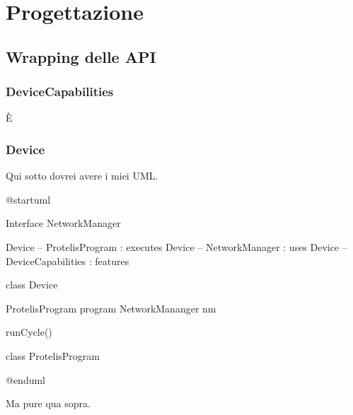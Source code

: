 \section{Progettazione}

\subsection{Wrapping delle API}

\subsubsection{DeviceCapabilities}

È

\subsubsection{Device}

Qui sotto dovrei avere i miei UML.

\begin{center}
\begin{plantuml}
@startuml

Interface NetworkManager

Device -- ProtelisProgram : executes
Device -- NetworkManager : uses
Device -- DeviceCapabilities : features

class Device {
  ProtelisProgram program
  NetworkMananger nm

  runCycle()
}

class ProtelisProgram {

}
@enduml
\end{plantuml}

\end{center}

Ma pure qua sopra.